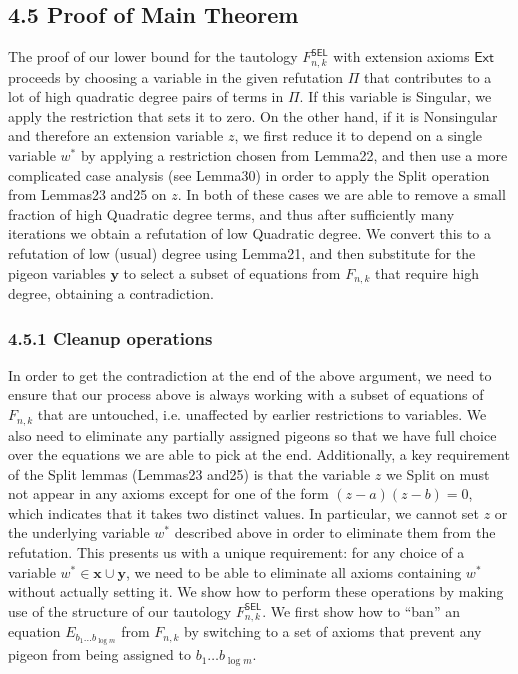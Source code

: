 \subsection*{4.5 Proof of Main Theorem}
The proof of our lower bound for the tautology $F^{\mathsf{SEL}}_{n,k}$ with extension axioms $\mathsf{Ext}$ proceeds by choosing a variable in the given refutation $\Pi$ that contributes to a lot of high quadratic degree pairs of terms in $\Pi$. If this variable is Singular, we apply the restriction that sets it to zero. On the other hand, if it is Nonsingular and therefore an extension variable $z$, we first reduce it to depend on a single variable $w^*$ by applying a restriction chosen from Lemma22, and then use a more complicated case analysis (see Lemma30) in order to apply the Split operation from Lemmas23 and25 on $z$. In both of these cases we are able to remove a small fraction of high Quadratic degree terms, and thus after sufficiently many iterations we obtain a refutation of low Quadratic degree. We convert this to a refutation of low (usual) degree using Lemma21, and then substitute for the pigeon variables $\mathbf y$ to select a subset of equations from $F_{n,k}$ that require high degree, obtaining a contradiction.
\subsubsection*{4.5.1 Cleanup operations}
In order to get the contradiction at the end of the above argument, we need to ensure that our process above is always working with a subset of equations of $F_{n,k}$ that are untouched, i.e. unaffected by earlier restrictions to variables. We also need to eliminate any partially assigned pigeons so that we have full choice over the equations we are able to pick at the end. Additionally, a key requirement of the Split lemmas (Lemmas23 and25) is that the variable $z$ we Split on must not appear in any axioms except for one of the form $(z-a)(z-b)=0$, which indicates that it takes two distinct values. In particular, we cannot set $z$ or the underlying variable $w^*$ described above in order to eliminate them from the refutation. This presents us with a unique requirement: for any choice of a variable $w^*\in\mathbf x\cup\mathbf y$, we need to be able to eliminate all axioms containing $w^*$ without actually setting it. We show how to perform these operations by making use of the structure of our tautology $F^{\mathsf{SEL}}_{n,k}$.
We first show how to ``ban'' an equation $E_{b_1\ldots b_{\log m}}$ from $F_{n,k}$ by switching to a set of axioms that prevent any pigeon from being assigned to $b_1\ldots b_{\log m}$.
